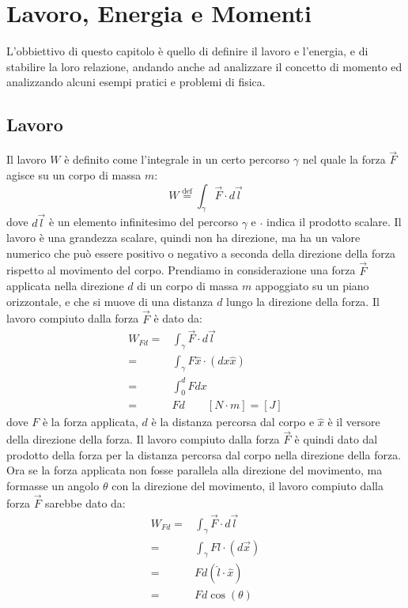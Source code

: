 \chapter{Lavoro, Energia e Momenti}
L'obbiettivo di questo capitolo è quello di definire il lavoro e l'energia, e di stabilire la loro relazione, andando anche ad analizzare il concetto di momento ed analizzando alcuni esempi pratici e problemi di fisica.

\section{Lavoro}
    Il lavoro $W$ è definito come l'integrale in un certo percorso $\gamma$ nel quale la forza $\vec{F}$ agisce su un corpo di massa $m$:
    \begin{equation}
        W \stackrel{\text{def}}{=} \int_{\gamma} \vec{F} \cdot d\vec{l}
    \end{equation}
    dove $d\vec{l}$ è un elemento infinitesimo del percorso $\gamma$ e $\cdot$ indica il prodotto scalare. Il lavoro è una grandezza scalare, quindi non ha direzione, ma ha un valore numerico che può essere positivo o negativo a seconda della direzione della forza rispetto al movimento del corpo.\newline
    Prendiamo in considerazione una forza $\vec{F}$ applicata nella direzione $d$ di un corpo di massa $m$ appoggiato su un piano orizzontale, e che si muove di una distanza $d$ lungo la direzione della forza. Il lavoro compiuto dalla forza $\vec{F}$ è dato da:
    $$
        \begin{aligned}
            W_{Fd} =& \int_{\gamma} \vec{F} \cdot d\vec{l}\\
            =& \int_{\gamma} F\hat{x}\cdot (dx \hat{x})\\
            =& \int_{0}^{d} F dx\\
            =& Fd \qquad [N\cdot m] = [J]
        \end{aligned}
    $$
    dove $F$ è la forza applicata, $d$ è la distanza percorsa dal corpo e $\hat{x}$ è il versore della direzione della forza. Il lavoro compiuto dalla forza $\vec{F}$ è quindi dato dal prodotto della forza per la distanza percorsa dal corpo nella direzione della forza.\newline
    Ora se la forza applicata non fosse parallela alla direzione del movimento, ma formasse un angolo $\theta$ con la direzione del movimento, il lavoro compiuto dalla forza $\vec{F}$ sarebbe dato da:
    $$
        \begin{aligned}
            W_{Fd} =& \int_{\gamma} \vec{F} \cdot d\vec{l}\\
            =& \int_{\gamma} F\hat{l}\cdot (d\vec{x})\\
            =& Fd(\hat{l}\cdot \hat{x})\\
            =& Fd\cos(\theta)
        \end{aligned}
    $$

